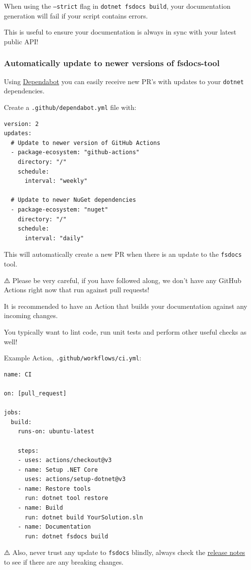 \documentclass{article}
\begin{document}
When using the \texttt{--strict} flag in \texttt{dotnet fsdocs build}, your documentation generation will fail if your script contains errors.

This is useful to ensure your documentation is always in sync with your latest public API!
\subsubsection*{Automatically update to newer versions of fsdocs-tool}



Using \href{https://docs.github.com/en/code-security/dependabot/dependabot-version-updates/about-dependabot-version-updates}{Dependabot} you can easily receive new PR's with updates to your \texttt{dotnet} dependencies.


Create a \texttt{.github/dependabot.yml} file with:
\begin{lstlisting}
version: 2
updates:
  # Update to newer version of GitHub Actions
  - package-ecosystem: "github-actions"
    directory: "/"
    schedule:
      interval: "weekly"

  # Update to newer NuGet dependencies
  - package-ecosystem: "nuget"
    directory: "/"
    schedule:
      interval: "daily"

\end{lstlisting}


This will automatically create a new PR when there is an update to the \texttt{fsdocs} tool.


⚠️ P️lease be very careful, if you have followed along, we don't have any GitHub Actions right now that run against pull requests!

It is recommended to have an Action that builds your documentation against any incoming changes.

You typically want to lint code, run unit tests and perform other useful checks as well!


Example Action, \texttt{.github/workflows/ci.yml}:
\begin{lstlisting}
name: CI

on: [pull_request]

jobs:
  build:
    runs-on: ubuntu-latest

    steps:
    - uses: actions/checkout@v3
    - name: Setup .NET Core
      uses: actions/setup-dotnet@v3
    - name: Restore tools
      run: dotnet tool restore
    - name: Build
      run: dotnet build YourSolution.sln
    - name: Documentation
      run: dotnet fsdocs build

\end{lstlisting}


⚠️ Also, never trust any update to \texttt{fsdocs} blindly, always check the \href{https://github.com/fsprojects/FSharp.Formatting/blob/main/RELEASE\_NOTES.md}{release notes} to see if there are any breaking changes.
\end{document}

